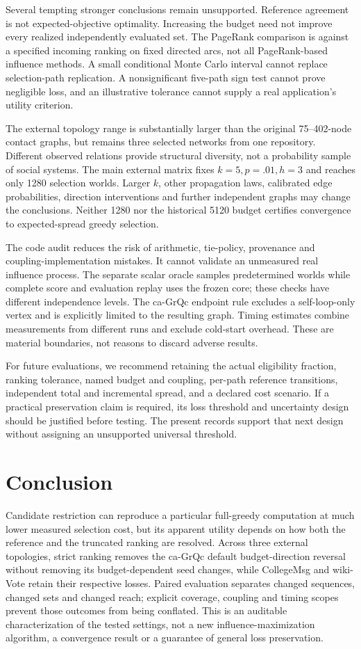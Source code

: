 \documentclass[smallextended]{svjour3}
\begin{document}
Several tempting stronger conclusions remain unsupported. Reference agreement is not expected-objective optimality. Increasing the budget need not improve every realized independently evaluated set. The PageRank comparison is against a specified incoming ranking on fixed directed arcs, not all PageRank-based influence methods. A small conditional Monte Carlo interval cannot replace selection-path replication. A nonsignificant five-path sign test cannot prove negligible loss, and an illustrative tolerance cannot supply a real application's utility criterion.

The external topology range is substantially larger than the original 75--402-node contact graphs, but remains three selected networks from one repository. Different observed relations provide structural diversity, not a probability sample of social systems. The main external matrix fixes $k=5,p=.01,h=3$ and reaches only 1280 selection worlds. Larger $k$, other propagation laws, calibrated edge probabilities, direction interventions and further independent graphs may change the conclusions. Neither 1280 nor the historical 5120 budget certifies convergence to expected-spread greedy selection.

The code audit reduces the risk of arithmetic, tie-policy, provenance and coupling-implementation mistakes. It cannot validate an unmeasured real influence process. The separate scalar oracle samples predetermined worlds while complete score and evaluation replay uses the frozen core; these checks have different independence levels. The ca-GrQc endpoint rule excludes a self-loop-only vertex and is explicitly limited to the resulting graph. Timing estimates combine measurements from different runs and exclude cold-start overhead. These are material boundaries, not reasons to discard adverse results.

For future evaluations, we recommend retaining the actual eligibility fraction, ranking tolerance, named budget and coupling, per-path reference transitions, independent total and incremental spread, and a declared cost scenario. If a practical preservation claim is required, its loss threshold and uncertainty design should be justified before testing. The present records support that next design without assigning an unsupported universal threshold.

\section{Conclusion}
Candidate restriction can reproduce a particular full-greedy computation at much lower measured selection cost, but its apparent utility depends on how both the reference and the truncated ranking are resolved. Across three external topologies, strict ranking removes the ca-GrQc default budget-direction reversal without removing its budget-dependent seed changes, while CollegeMsg and wiki-Vote retain their respective losses. Paired evaluation separates changed sequences, changed sets and changed reach; explicit coverage, coupling and timing scopes prevent those outcomes from being conflated. This is an auditable characterization of the tested settings, not a new influence-maximization algorithm, a convergence result or a guarantee of general loss preservation.
\end{document}
